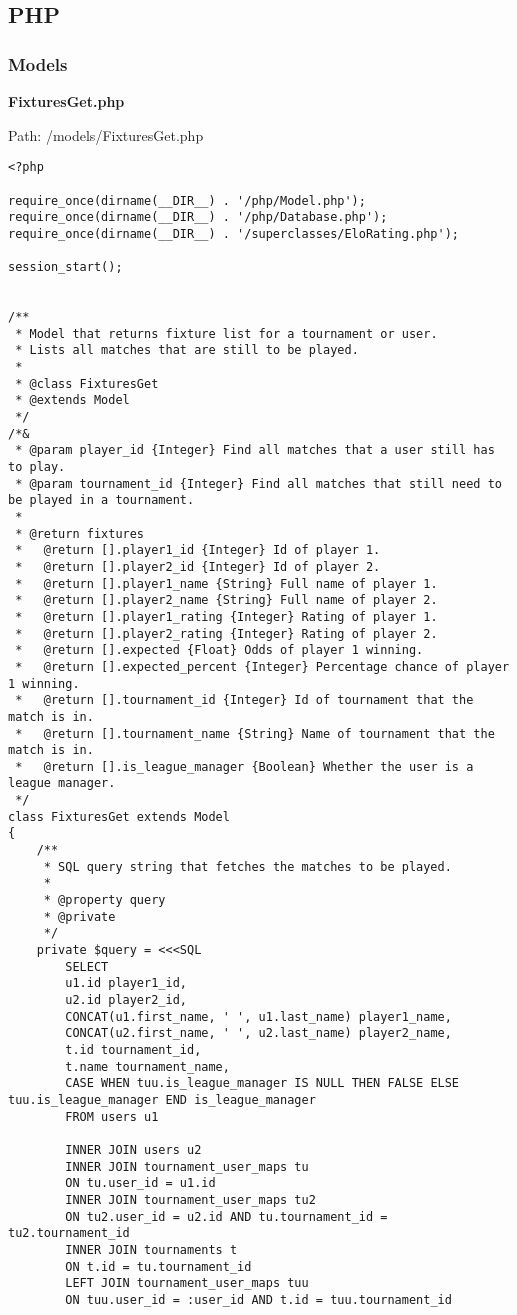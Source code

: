 \newpage
\subsection{PHP}
\subsubsection{Models}
\textbf{FixturesGet.php}

Path: /models/FixturesGet.php
{\scriptsize
\begin{lstlisting}
<?php

require_once(dirname(__DIR__) . '/php/Model.php');
require_once(dirname(__DIR__) . '/php/Database.php');
require_once(dirname(__DIR__) . '/superclasses/EloRating.php');

session_start();


/**
 * Model that returns fixture list for a tournament or user.
 * Lists all matches that are still to be played.
 *
 * @class FixturesGet
 * @extends Model
 */
/*&
 * @param player_id {Integer} Find all matches that a user still has to play.
 * @param tournament_id {Integer} Find all matches that still need to be played in a tournament.
 *
 * @return fixtures
 *   @return [].player1_id {Integer} Id of player 1.
 *   @return [].player2_id {Integer} Id of player 2.
 *   @return [].player1_name {String} Full name of player 1.
 *   @return [].player2_name {String} Full name of player 2.
 *   @return [].player1_rating {Integer} Rating of player 1.
 *   @return [].player2_rating {Integer} Rating of player 2.
 *   @return [].expected {Float} Odds of player 1 winning.
 *   @return [].expected_percent {Integer} Percentage chance of player 1 winning.
 *   @return [].tournament_id {Integer} Id of tournament that the match is in.
 *   @return [].tournament_name {String} Name of tournament that the match is in.
 *   @return [].is_league_manager {Boolean} Whether the user is a league manager.
 */
class FixturesGet extends Model
{
	/**
	 * SQL query string that fetches the matches to be played.
	 *
	 * @property query
	 * @private
	 */
	private $query = <<<SQL
		SELECT
		u1.id player1_id,
		u2.id player2_id,
		CONCAT(u1.first_name, ' ', u1.last_name) player1_name,
		CONCAT(u2.first_name, ' ', u2.last_name) player2_name,
		t.id tournament_id,
		t.name tournament_name,
		CASE WHEN tuu.is_league_manager IS NULL THEN FALSE ELSE tuu.is_league_manager END is_league_manager
		FROM users u1

		INNER JOIN users u2
		INNER JOIN tournament_user_maps tu
		ON tu.user_id = u1.id
		INNER JOIN tournament_user_maps tu2
		ON tu2.user_id = u2.id AND tu.tournament_id = tu2.tournament_id
		INNER JOIN tournaments t
		ON t.id = tu.tournament_id
		LEFT JOIN tournament_user_maps tuu
		ON tuu.user_id = :user_id AND t.id = tuu.tournament_id


\end{lstlisting}}

